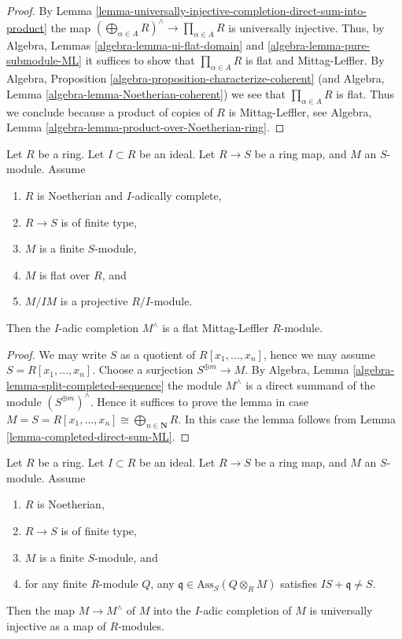 \begin{proof}
By
Lemma \ref{lemma-universally-injective-completion-direct-sum-into-product}
the map $\left(\bigoplus\nolimits_{\alpha \in A} R\right)^\wedge
\to \prod_{\alpha \in A} R$ is universally injective.
Thus, by
Algebra, Lemmas \ref{algebra-lemma-ui-flat-domain} and
\ref{algebra-lemma-pure-submodule-ML}
it suffices to show that $\prod_{\alpha \in A} R$ is flat and Mittag-Leffler.
By
Algebra, Proposition \ref{algebra-proposition-characterize-coherent}
(and
Algebra, Lemma \ref{algebra-lemma-Noetherian-coherent})
we see that $\prod_{\alpha \in A} R$ is flat.
Thus we conclude because a product of copies of $R$ is Mittag-Leffler, see
Algebra, Lemma \ref{algebra-lemma-product-over-Noetherian-ring}.
\end{proof}

\begin{lemma}
\label{lemma-lift-ML}
Let $R$ be a ring.
Let $I \subset R$ be an ideal.
Let $R \to S$ be a ring map, and $M$ an $S$-module.
Assume
\begin{enumerate}
\item $R$ is Noetherian and $I$-adically complete,
\item $R \to S$ is of finite type,
\item $M$ is a finite $S$-module,
\item $M$ is flat over $R$, and
\item $M/IM$ is a projective $R/I$-module.
\end{enumerate}
Then the $I$-adic completion $M^\wedge$ is a flat Mittag-Leffler
$R$-module.
\end{lemma}

\begin{proof}
We may write $S$ as a quotient of $R[x_1, \ldots, x_n]$, hence
we may assume $S = R[x_1, \ldots, x_n]$. Choose a surjection
$S^{\oplus m} \to M$. By
Algebra, Lemma \ref{algebra-lemma-split-completed-sequence}
the module $M^\wedge$ is a direct summand of the module
$(S^{\oplus m})^\wedge$. Hence it suffices to prove the lemma
in case $M = S = R[x_1, \ldots, x_n] \cong \bigoplus_{n \in \mathbf{N}} R$.
In this case the lemma follows from
Lemma \ref{lemma-completed-direct-sum-ML}.
\end{proof}

\begin{lemma}
\label{lemma-universally-injective-to-completion}
Let $R$ be a ring.
Let $I \subset R$ be an ideal.
Let $R \to S$ be a ring map, and $M$ an $S$-module.
Assume
\begin{enumerate}
\item $R$ is Noetherian,
\item $R \to S$ is of finite type,
\item $M$ is a finite $S$-module, and
\item for any finite $R$-module $Q$, any
$\mathfrak q \in \text{Ass}_S(Q \otimes_R M)$
satisfies $IS + \mathfrak q \not = S$.
\end{enumerate}
Then the map $M \to M^\wedge$ of $M$ into the $I$-adic completion of $M$
is universally injective as a map of $R$-modules.
\end{lemma}

